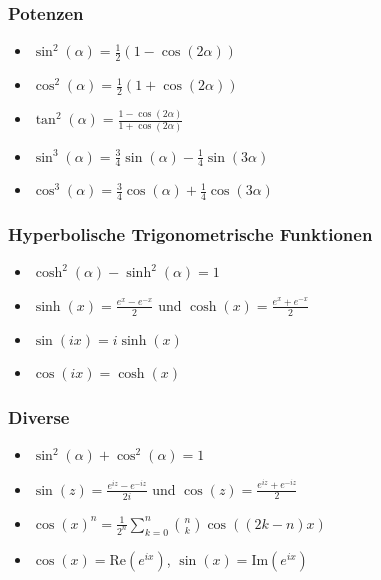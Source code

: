 \documentclass[a4paper,10pt]{article}
\def\Re{\text{Re}}
\def\Im{\text{Im}}
\begin{document}
\subsubsection{Potenzen}
\begin{itemize}
 \item $\sin^2(\alpha) = \frac{1}{2}(1-\cos(2\alpha))$
 \item $\cos^2(\alpha) = \frac{1}{2}(1+\cos(2\alpha))$
 \item $\tan^2(\alpha) = \frac{1-\cos(2\alpha)}{1+\cos(2\alpha)}$
 \item $\sin^3(\alpha) = \frac{3}{4} \sin(\alpha) - \frac{1}{4} \sin(3 \alpha)$
 \item $\cos^3(\alpha) = \frac{3}{4} \cos(\alpha) + \frac{1}{4} \cos(3 \alpha)$
\end{itemize}

\subsubsection{Hyperbolische Trigonometrische Funktionen}
\begin{itemize}
  \item $\cosh^2(\alpha) - \sinh^2(\alpha) = 1$
  \item $\sinh(x) = \frac{e^x - e^{-x}}{2}$ und $\cosh(x) = \frac{e^x + e^{-x}}{2}$
  \item $\sin(ix) = i \sinh(x)$
  \item $\cos(ix) = \cosh(x)$
 \end{itemize}

\subsubsection{Diverse}

\begin{itemize}
 \item $\sin^2(\alpha) + \cos^2(\alpha) = 1$
 \item $\sin(z) = \frac{e^{iz} - e^{-iz}}{2i}$ und $\cos(z) = \frac{e^{iz} + e^{-iz}}{2}$
 \item $\cos(x)^n = \frac{1}{2^n} \sum_{k=0}^n {n \choose k} \cos((2k - n)x)$
 \item $\cos(x) = \Re(e^{ix})$, $\sin(x) = \Im(e^{ix})$
\end{itemize}
\end{document}
